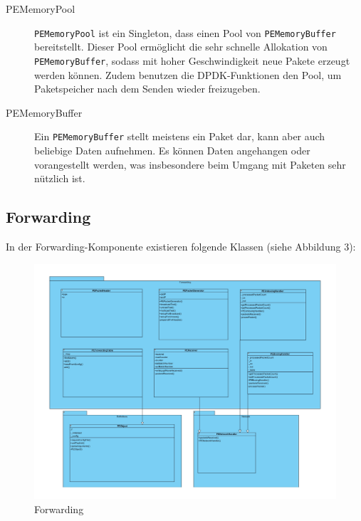 \documentclass[a4paper, 11pt, ngerman, fleqn]{article}
\begin{document}
\begin{description}
	\item[PEMemoryPool] 
	\texttt{PEMemoryPool} ist ein Singleton, dass einen Pool von \texttt{PEMemoryBuffer} bereitstellt.
	Dieser Pool ermöglicht die sehr schnelle Allokation von \texttt{PEMemoryBuffer}, sodass mit hoher Geschwindigkeit neue Pakete erzeugt werden können.
	Zudem benutzen die DPDK-Funktionen den Pool, um Paketspeicher nach dem Senden wieder freizugeben.
	
	
	\item[PEMemoryBuffer]
	Ein \texttt{PEMemoryBuffer} stellt meistens ein Paket dar, kann aber auch beliebige Daten aufnehmen.
	Es können Daten angehangen oder vorangestellt werden, was insbesondere beim Umgang mit Paketen sehr nützlich ist.
\end{description}

\subsection{Forwarding}
In der Forwarding-Komponente existieren folgende Klassen (siehe Abbildung 3):

\begin{figure}
	\begin{center}
		\includegraphics[width=1 \textwidth]{figures/Forwarding.pdf}
		\caption{Forwarding}
	\end{center}
\end{figure}
\end{document}
